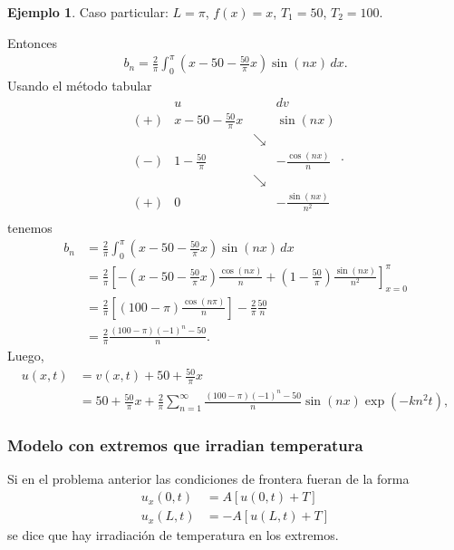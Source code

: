 \documentclass[11pt,letterpaper,draft]{report}
\theoremstyle{plain}
\theoremstyle{definition}
\newtheorem{example}[theorem]{Ejemplo}
\theoremstyle{remark}
\newcommand\<{\langle}
\renewcommand\>{\rangle}
\begin{document}
\begin{example}
  Caso particular: $L=\pi$, $f(x)=x$, $T_1=50$, $T_2=100$.

  Entonces
  \begin{align*}
    b_n
    = \frac{2}{\pi}\int_0^\pi(x-50-\tfrac{50}{\pi}x)\sin(nx)\,dx.
  \end{align*}
  Usando el método tabular
  \[
    \begin{array}{c|c|c|c}
      & u & &  dv \\
      (+) & x-50-\tfrac{50}{\pi}x & & \sin(nx) \\
      && \searrow \\
      (-) & 1-\tfrac{50}{\pi} && -\frac{\cos(nx)}{n} \\
      && \searrow \\
      (+) & 0 && -\frac{\sin(nx)}{n^2}\\
    \end{array}
  .\]
  tenemos
  \begin{align*}
    b_n
    &= \frac{2}{\pi}\int_0^\pi(x-50-\tfrac{50}{\pi}x)\sin(nx)\,dx
    \\
    &= \frac{2}{\pi}\left[
    -\left(x-50-\frac{50}{\pi}x\right)\frac{\cos(nx)}{n}
    + \left(1-\frac{50}{\pi}\right)\frac{\sin(nx)}{n^2}
    \right]_{x=0}^\pi \\
    &= \frac{2}{\pi}
    \left[
    (100-\pi)\frac{\cos(n\pi)}{n}
    \right]
    -
    \frac{2}{\pi} \frac{50}{n} \\
    &= \frac{2}{\pi}\frac{(100-\pi)(-1)^n-50}{n}.
  \end{align*}
  Luego,
  \begin{align*}
    u(x,t)
    &= v(x,t) + 50+\frac{50}{\pi}x \\
    &= 50+\frac{50}{\pi}x
      + \frac{2}{\pi}\sum_{n=1}^{\infty}
      \frac{(100-\pi)(-1)^n-50}{n}
      \sin(nx)\exp(-kn^2t),
  \end{align*}
\end{example}

\subsubsection{Modelo con extremos que irradian temperatura}

Si en el problema anterior las condiciones de frontera fueran de
la forma
\begin{align*}
  u_x(0,t) &= A[u(0,t) + T] \\
  u_x(L,t) &= -A[u(L,t) + T]
\end{align*}
se dice que hay irradiación de temperatura en los extremos.
\end{document}
